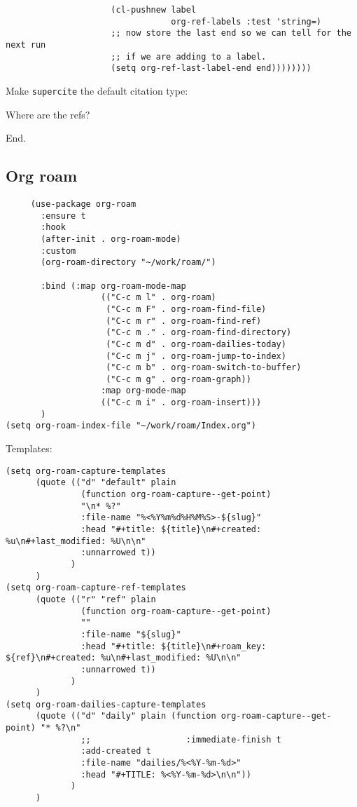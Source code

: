 \documentclass[12pt]{article}
\begin{document}
\begin{verbatim}
                     (cl-pushnew label
                                 org-ref-labels :test 'string=)
                     ;; now store the last end so we can tell for the next run
                     ;; if we are adding to a label.
                     (setq org-ref-last-label-end end))))))))

\end{verbatim}

Make \texttt{supercite} the default citation type:

Where are the refs?

End.

\subsection{Org roam}
\label{sec:org00ea2f7}
\begin{verbatim}
     (use-package org-roam
       :ensure t
       :hook
       (after-init . org-roam-mode)
       :custom
       (org-roam-directory "~/work/roam/")

       :bind (:map org-roam-mode-map
                   (("C-c m l" . org-roam)
                    ("C-c m F" . org-roam-find-file)
                    ("C-c m r" . org-roam-find-ref)
                    ("C-c m ." . org-roam-find-directory)
                    ("C-c m d" . org-roam-dailies-today)
                    ("C-c m j" . org-roam-jump-to-index)
                    ("C-c m b" . org-roam-switch-to-buffer)
                    ("C-c m g" . org-roam-graph))
                   :map org-mode-map
                   (("C-c m i" . org-roam-insert)))
       )
(setq org-roam-index-file "~/work/roam/Index.org")
\end{verbatim}

Templates: 

\begin{verbatim}
(setq org-roam-capture-templates
      (quote (("d" "default" plain
               (function org-roam-capture--get-point)
               "\n* %?"
               :file-name "%<%Y%m%d%H%M%S>-${slug}"
               :head "#+title: ${title}\n#+created: %u\n#+last_modified: %U\n\n"
               :unnarrowed t))
             )
      )
(setq org-roam-capture-ref-templates
      (quote (("r" "ref" plain
               (function org-roam-capture--get-point)
               ""
               :file-name "${slug}"
               :head "#+title: ${title}\n#+roam_key: ${ref}\n#+created: %u\n#+last_modified: %U\n\n"
               :unnarrowed t))
             )
      )
(setq org-roam-dailies-capture-templates
      (quote (("d" "daily" plain (function org-roam-capture--get-point) "* %?\n"
               ;;                   :immediate-finish t
               :add-created t 
               :file-name "dailies/%<%Y-%m-%d>"
               :head "#+TITLE: %<%Y-%m-%d>\n\n"))
             )
      )
\end{verbatim}
\end{document}
